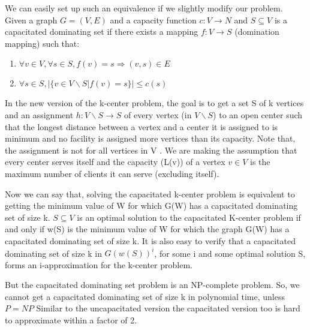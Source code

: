 \documentclass[12pt,a4paper,onecolumn]{article}
\begin{document}
We can easily set up such an equivalence if we slightly modify our problem. Given a graph $G = (V,E)$ and a capacity function $c : V \rightarrow N$ and $S \subseteq V$ is a capacitated dominating set if there exists a mapping $f : V \rightarrow S$ (domination mapping) such that:\begin{enumerate}

\item $\forall v \in V ,\forall s \in S,f(v) = s \Longrightarrow (v,s) \in E$\\ \item $\forall s \in S,| \{ v \in V \backslash S | f(v) = s \} | \leq c(s)$
\end{enumerate}In the new version of the k-center problem, the goal is to get a set S of k vertices and an assignment $h : V \backslash S \rightarrow S$ of every vertex (in $V \backslash S$) to an open center such that the longest distance between a vertex and a center it is assigned to is minimum and no facility is assigned more vertices than its capacity. Note that, the assignment is not for all vertices in V . We are making the assumption that every center serves itself and the capacity (L(v)) of a vertex $v \in V$ is the maximum number of clients it can serve (excluding itself). 

Now we can say that, solving the capacitated k-center problem is equivalent to getting the minimum value of W for which G(W) has a capacitated dominating set of size k. 
$S \subseteq V$ is an optimal solution to the capacitated K-center problem if and only if w(S) is the minimum value of W for which the graph G(W) has a capacitated dominating set of size k.
It is also easy to verify that a capacitated dominating set of size k in $G(w(S))^i$, for some i and some optimal solution S, forms an i-approximation for the k-center problem.

But the capacitated dominating set problem is an NP-complete problem. So, we cannot get a capacitated dominating set of size k in polynomial time, unless $P = NP$ Similar to the uncapacitated version the capacitated version too is hard to approximate within a factor of 2.
\end{document}

